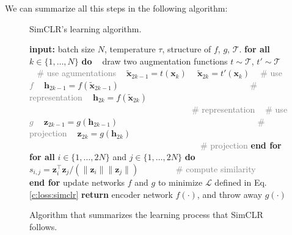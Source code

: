 We can summarize all this steps in the following algorithm:
\begin{figure}[H]
\begin{algorithm}[H]
    \caption{\label{alg:main} SimCLR's learning algorithm.}
    \begin{algorithmic}
        \STATE \textbf{input:} batch size $N$, temperature $\tau$, structure of $f$, $g$, $\mathcal{T}$.
        \STATE \textbf{for all} $k\in \{1, \ldots, N\}$ \textbf{do}
            \STATE $~~~~$draw two augmentation functions $t \!\sim\! \mathcal{T}$, $t' \!\sim\! \mathcal{T}$
            \STATE $~~~~$\textcolor{gray}{\# use agumentations} 
            \STATE $~~~~$$\tilde{\bm x}_{2k-1} = t(\bm x_k)$
            \STATE $~~~~$$\tilde{\bm x}_{2k} = t'(\bm x_k)$
            \STATE $~~~~$\textcolor{gray}{\# use $f$} 
            \STATE $~~~~$$\bm h_{2k-1} = f(\tilde{\bm x}_{2k-1})$  \textcolor{gray}{~~~~~~~~~~~~~~~~~~~~~~~~~~~~~~\# representation}
            \STATE $~~~~$$\bm h_{2k} = f(\tilde{\bm x}_{2k})$      \textcolor{gray}{~~~~~~~~~~~~~~~~~~~~~~~~~~~~~~~~~~~~~~\# representation}
            \STATE $~~~~$\textcolor{gray}{\# use $g$} 
            \STATE $~~~~$$\bm z_{2k-1} = g({\bm h}_{2k-1})$  \textcolor{gray}{~~~~~~~~~~~~~~~~~~~~~~~~~~~~~~~~\# projection}
            \STATE $~~~~$$\bm z_{2k} = g({\bm h}_{2k})$      \textcolor{gray}{~~~~~~~~~~~~~~~~~~~~~~~~~~~~~~~~~~~~~~~~\# projection}
        \STATE \textbf{end for}
        \STATE \textbf{for all} $i\in\{1, \ldots, 2N\}$ and $j\in\{1, \dots, 2N\}$ \textbf{do}
        \STATE $~~~~$ $s_{i,j} = \bm z_i^\top \bm z_j / (\lVert\bm z_i\rVert \lVert\bm z_j\rVert)$ \textcolor{gray}{~~~~~~~~\# compute similarity}\\
        \STATE \textbf{end for}
        \STATE update networks $f$ and $g$ to minimize $\mathcal{L}$ defined in Eq. \eqref{c:loss:simclr}
        \ENDFOR
        \STATE \textbf{return} encoder network $f(\cdot)$, and throw away $g(\cdot)$
    \end{algorithmic}
    \end{algorithm}
    
    \caption{Algorithm that summarizes the learning process that SimCLR follows.}
\end{figure}

